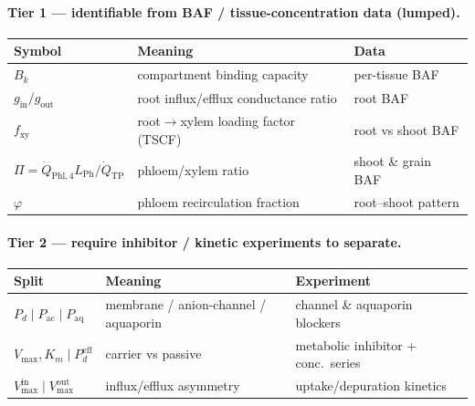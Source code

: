 \documentclass[12pt,a4paper]{article}
\begin{document}
\paragraph{Tier 1 --- identifiable from BAF / tissue-concentration data (lumped).}
\begin{center}
\renewcommand{\arraystretch}{1.25}
\begin{tabular}{@{}p{4.4cm}p{6.2cm}p{3.6cm}@{}}
\toprule
\textbf{Symbol} & \textbf{Meaning} & \textbf{Data} \\
\midrule
$B_k$ & compartment binding capacity & per-tissue BAF \\
$g_\mathrm{in}/g_\mathrm{out}$ & root influx/efflux conductance ratio & root BAF \\
$f_\mathrm{xy}$ & root$\to$xylem loading factor (TSCF) & root vs shoot BAF \\
$\Pi=\dot Q_\mathrm{Phl,4}L_\mathrm{Ph}/\dot Q_\mathrm{TP}$ & phloem/xylem ratio & shoot \& grain BAF \\
$\varphi$ & phloem recirculation fraction & root--shoot pattern \\
\bottomrule
\end{tabular}
\end{center}

\paragraph{Tier 2 --- require inhibitor / kinetic experiments to separate.}
\begin{center}
\renewcommand{\arraystretch}{1.25}
\begin{tabular}{@{}p{4.4cm}p{6.2cm}p{3.6cm}@{}}
\toprule
\textbf{Split} & \textbf{Meaning} & \textbf{Experiment} \\
\midrule
$P_d\mid P_\mathrm{ac}\mid P_\mathrm{aq}$ & membrane / anion-channel / aquaporin & channel \& aquaporin blockers \\
$V_{\max},K_m\mid P_d^{\mathrm{eff}}$ & carrier vs passive & metabolic inhibitor + conc.\ series \\
$V_{\max}^{\mathrm{in}}\mid V_{\max}^{\mathrm{out}}$ & influx/efflux asymmetry & uptake/depuration kinetics \\
\bottomrule
\end{tabular}
\end{center}
\end{document}
